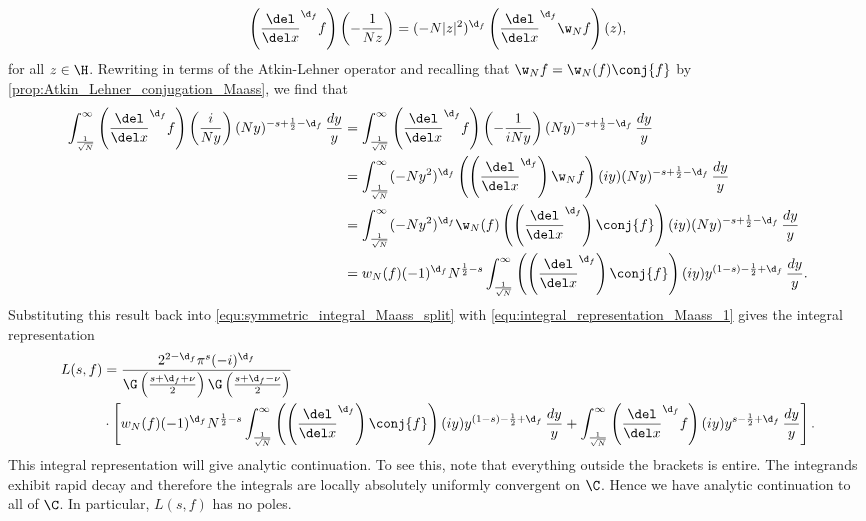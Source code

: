       \[
        \left(\frac{\del}{\del x}^{\d_{f}}f\right)\left(-\frac{1}{Nz}\right) = (-N|z|^{2})^{\d_{f}}\left(\frac{\del}{\del x}^{\d_{f}}\w_{N}f\right)(z),
      \]
      for all $z \in \H$. Rewriting in terms of the Atkin-Lehner operator and recalling that $\w_{N}f = \w_{N}(f)\conj{f}$ by \cref{prop:Atkin_Lehner_conjugation_Maass}, we find that
      \begin{align*}
        \int_{\frac{1}{\sqrt{N}}}^{\infty}\left(\frac{\del}{\del x}^{\d_{f}}f\right)\left(\frac{i}{Ny}\right)(Ny)^{-s+\frac{1}{2}-\d_{f}}\,\frac{dy}{y} &= \int_{\frac{1}{\sqrt{N}}}^{\infty}\left(\frac{\del}{\del x}^{\d_{f}}f\right)\left(-\frac{1}{iNy}\right)(Ny)^{-s+\frac{1}{2}-\d_{f}}\,\frac{dy}{y} \\
        &= \int_{\frac{1}{\sqrt{N}}}^{\infty}(-Ny^{2})^{\d_{f}}\left(\left(\frac{\del}{\del x}^{\d_{f}}\right)\w_{N}f\right)(iy)(Ny)^{-s+\frac{1}{2}-\d_{f}}\,\frac{dy}{y} \\
        &= \int_{\frac{1}{\sqrt{N}}}^{\infty}(-Ny^{2})^{\d_{f}}\w_{N}(f)\left(\left(\frac{\del}{\del x}^{\d_{f}}\right)\conj{f}\right)(iy)(Ny)^{-s+\frac{1}{2}-\d_{f}}\,\frac{dy}{y} \\
        &= w_{N}(f)(-1)^{\d_{f}}N^{\frac{1}{2}-s}\int_{\frac{1}{\sqrt{N}}}^{\infty}\left(\left(\frac{\del}{\del x}^{\d_{f}}\right)\conj{f}\right)(iy)y^{(1-s)-\frac{1}{2}+\d_{f}}\,\frac{dy}{y}.
      \end{align*}
      Substituting this result back into \cref{equ:symmetric_integral_Maass_split} with \cref{equ:integral_representation_Maass_1} gives the integral representation
      \begin{align*}
        L(s,f) &= \frac{2^{2-\d_{f}}\pi^{s}(-i)^{\d_{f}}}{\G\left(\frac{s+\d_{f}+\nu}{2}\right)\G\left(\frac{s+\d_{f}-\nu}{2}\right)} \\
        &\cdot \left[w_{N}(f)(-1)^{\d_{f}}N^{\frac{1}{2}-s}\int_{\frac{1}{\sqrt{N}}}^{\infty}\left(\left(\frac{\del}{\del x}^{\d_{f}}\right)\conj{f}\right)(iy)y^{(1-s)-\frac{1}{2}+\d_{f}}\,\frac{dy}{y}+\int_{\frac{1}{\sqrt{N}}}^{\infty}\left(\frac{\del}{\del x}^{\d_{f}}f\right)(iy)y^{s-\frac{1}{2}+\d_{f}}\,\frac{dy}{y}\right].
      \end{align*}
      This integral representation will give analytic continuation. To see this, note that everything outside the brackets is entire. The integrands exhibit rapid decay and therefore the integrals are locally absolutely uniformly convergent on $\C$. Hence we have analytic continuation to all of $\C$. In particular, $L(s,f)$ has no poles.
